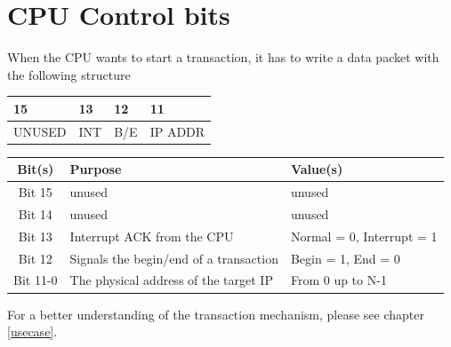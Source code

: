 \section{CPU Control bits } \label{transaction}

	When the CPU wants to start a transaction, it has to write a data packet with the following structure\\
	\begin{center}
	\begin{tabular}{ | l | l |  l | l | }
		
		15  \qquad  \qquad 14 & 13 & 12 & 11 \qquad \qquad 0 \\ \hline
		UNUSED & INT & B/E & IP ADDR\\ \hline
		
		
		\hline
	\end{tabular}
\end{center}

\bigskip
\begin{center}
	\begin{tabular}{ | c | p{7 cm} |  l |}
		\hline
		Bit(s) & Purpose & Value(s)  \\ \hline
		Bit 15 & unused  & unused 
		\\ \hline
		Bit 14 & unused  & unused\\
		\hline
		Bit 13 & Interrupt ACK from the CPU   & Normal = 0, Interrupt  =  1
		\\ \hline
		
		Bit 12 & Signals the begin/end of a transaction & Begin  = 1, End = 0 
		\\ \hline
			
		
			
		Bit 11-0 & The physical address of the target IP &
		From 0 up to N-1  \\
		
		
		
		\hline
	\end{tabular}
\end{center}
For a better understanding of the transaction mechanism, please see chapter \ref{usecase}.
